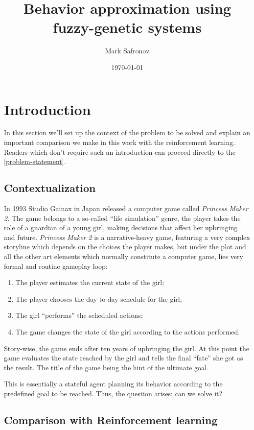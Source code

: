 \documentclass[11pt, a4paper]{article}
\title{Behavior approximation using fuzzy-genetic systems}
\author{Mark Safronov}
\date{\today}
\begin{document}
	
	
	
	\tableofcontents
	
	\section{Introduction}
	
	In this section we'll set up the context of the problem to be solved and explain an important comparison we make in this work with the reinforcement learning.
	Readers which don't require such an introduction can proceed directly to the \ref{problem-statement}.
	
	\subsection{Contextualization}

	In 1993 Studio Gainax in Japan released a computer game called \textit{Princess Maker 2}.
	The game belongs to a so-called ``life simulation'' genre, the player takes the role of a guardian of a young girl, making decisions that affect her upbringing and future.
	\textit{Princess Maker 2} is a narrative-heavy game, featuring a very complex storyline which depends on the choices the player makes, but under the plot and all the other art elements which normally constitute a computer game, lies very formal and routine gameplay loop:
	
	\begin{enumerate}
		\item The player estimates the current state of the girl;
		\item The player chooses the day-to-day schedule for the girl;
		\item The girl ``performs'' the scheduled actions;
		\item The game changes the state of the girl according to the actions performed.
	\end{enumerate}
	
	Story-wise, the game ends after ten years of upbringing the girl.
	At this point the game evaluates the state reached by the girl and tells the final ``fate'' she got as the result.
	The title of the game being the hint of the ultimate goal.
		
	This is essentially a stateful agent planning its behavior according to the predefined goal to be reached.
	Thus, the question arises: can we solve it?

	\subsection{Comparison with Reinforcement learning}
\end{document}
